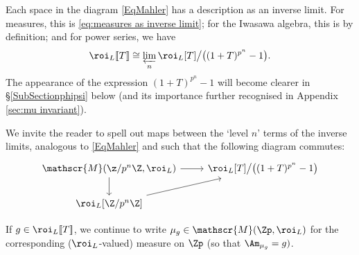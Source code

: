 \documentclass[a4paper,10pt, english, reqno]{smfart}
\newcommand{\lsem}{[\! [}
\newcommand{\rsem}{]\! ]}
\numberwithin{equation}{section}
\begin{document}
\begin{remark}
Each space in the diagram \eqref{EqMahler} has a description as an inverse limit. For measures, this is \eqref{eq:measures as inverse limit}; for the Iwasawa algebra, this is by definition; and for power series, we have 
\[
    \roi_L\lsem T\rsem \cong \varprojlim_n \roi_L[T]\big/\big((1+T)^{p^n} - 1\big).
\]
The appearance of the expression $(1+T)^{p^n} - 1$ will become clearer in \S\ref{SubSectionphipsi} below (and its importance further recognised in Appendix \ref{sec:mu invariant}).

We invite the reader to spell out maps between the  `level $n$' terms of the inverse limits,  analogous to \eqref{EqMahler} and such that the following diagram commutes:
\[
	\begin{tikzcd}
		\mathscr{M}(\z/p^n\Z, \roi_L) \ar[r] \ar[d] & \roi_L[T]\big/\big((1+T)^{p^n} - 1\big)\\
		\roi_L[\Z/p^n\Z] \ar[ur] &
	\end{tikzcd}
\]

\end{remark}

\begin{definition}
If $g \in \roi_L\lsem T\rsem $, we continue to write $\mu_g \in \mathscr{M}(\Zp, \roi_L)$ for the corresponding ($\roi_L$-valued) measure on $\Zp$ (so that $\Am_{\mu_g} = g)$.
\end{definition}
\end{document}
